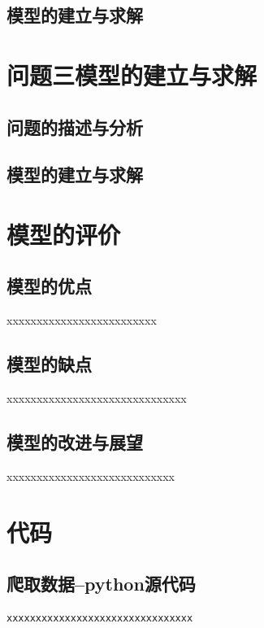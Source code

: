 \documentclass{whutmod}
\begin{document}
	\subsection{模型的建立与求解}
	

	\section{问题三模型的建立与求解}
	
	
	\subsection{问题的描述与分析}

	\subsection{模型的建立与求解}


	\section{模型的评价}
	\subsection{模型的优点}
xxxxxxxxxxxxxxxxxxxxxxxxx
	
	\subsection{模型的缺点}
xxxxxxxxxxxxxxxxxxxxxxxxxxxxxx


	\subsection{模型的改进与展望}%
xxxxxxxxxxxxxxxxxxxxxxxxxxxx
	\newpage	%
	\nocite{*}		%
	\printbibliography[title = {参考文献}]	%
	
	\newpage
	\appendix %
\section{代码}
\subsection{爬取数据--python源代码}
\begin{lstlisting}[language=python]%这里修改语言
xxxxxxxxxxxxxxxxxxxxxxxxxxxxxxxx
\end{lstlisting}
\end{document}
